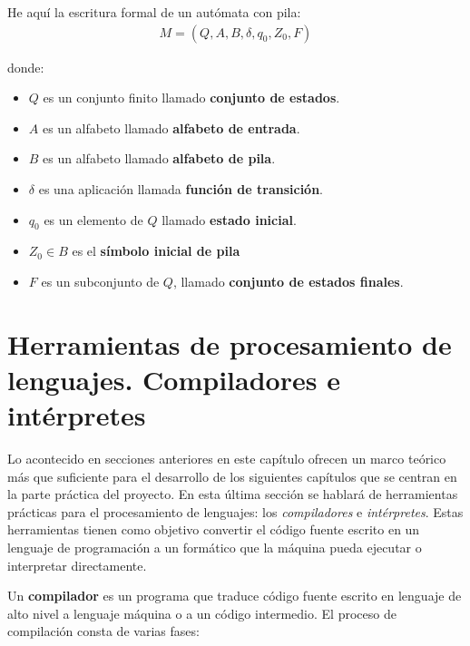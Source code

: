 \noindent
He aquí la escritura formal de un autómata con pila:
\begin{align*}
    M = (Q,A,B,\delta,q_0,Z_0,F)
\end{align*}

\noindent
donde:
\begin{itemize}
    \item $Q$ es un conjunto finito llamado \textbf{conjunto de estados}.
    \item $A$ es un alfabeto llamado \textbf{alfabeto de entrada}.
    \item $B$ es un alfabeto llamado \textbf{alfabeto de pila}.
    \item $\delta$ es una aplicación llamada \textbf{función de transición}.
    \item $q_0$ es un elemento de $Q$ llamado \textbf{estado inicial}.
    \item $Z_0 \in B$ es el \textbf{símbolo inicial de pila}
    \item $F$ es un subconjunto de $Q$, llamado \textbf{conjunto de estados finales}.
\end{itemize}

\section{Herramientas de procesamiento de lenguajes. Compiladores e intérpretes}\label{section:compiladores}
Lo acontecido en secciones anteriores en este capítulo ofrecen un marco teórico más que suficiente para el desarrollo de los siguientes capítulos que se centran en la parte práctica del proyecto. En esta última sección se hablará de herramientas prácticas para el procesamiento de lenguajes: los \textit{compiladores} e \textit{intérpretes}. Estas herramientas tienen como objetivo convertir el código fuente escrito en un lenguaje de programación a un formático que la máquina pueda ejecutar o interpretar directamente.

Un \textbf{compilador} es un programa que traduce código fuente escrito en lenguaje de alto nivel a lenguaje máquina o a un código intermedio. El proceso de compilación consta de varias fases:

